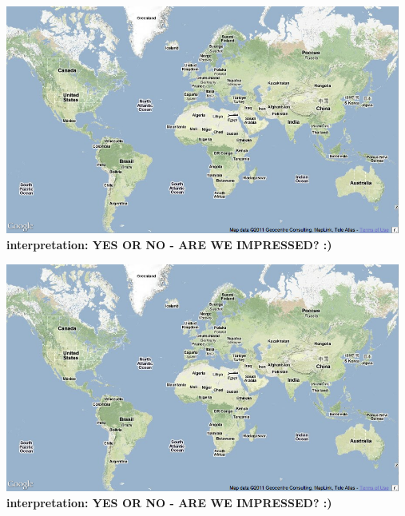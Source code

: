 \documentclass[11pt,a4paper,english]{article}
\begin{document}
\begin{itemize}
						\includegraphics[width=130mm]{img/2005-1}
						\bf interpretation: \rm YES OR NO - ARE WE IMPRESSED? :)
						
						
					
						\includegraphics[width=130mm]{img/2005-1}
						\bf interpretation: \rm YES OR NO - ARE WE IMPRESSED? :)
						
						


\end{itemize}
\end{document}
